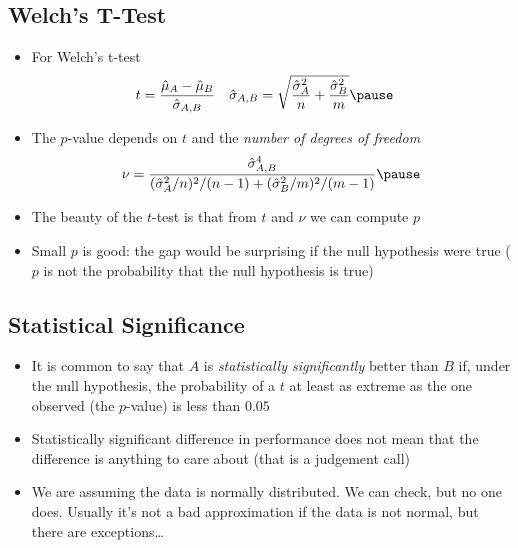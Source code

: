
\begin{slide}
\section{Welch's T-Test}

\begin{PauseHighLight}
  \begin{itemize}
  \item For Welch's t-test
    \begin{align*}
      t &= \frac{\hat{\mu}_A - \hat{\mu}_B}{\hat{\sigma}_{A,B}}
      &
      \hat{\sigma}_{A,B} &= \sqrt{\frac{\hat{\sigma}_A^2}{n} +
        \frac{\hat{\sigma}_B^2}{m} }\pause 
    \end{align*}
  \item The $p$-value depends on $t$ and the \textit{number of degrees of
      freedom}
    \begin{align*}
      \nu = \frac{ \hat{\sigma}_{A,B}^4}{(\hat{\sigma}_A^2/n)^2/(n-1)
        + (\hat{\sigma}_B^2/m)^2/(m-1)}\pause
    \end{align*}
  \item The beauty of the $t$-test is that from $t$ and $\nu$ we can
    compute $p$\pause
  \item Small $p$ is good: the gap would be surprising if the null
    hypothesis were true\pause{} {\small ($p$ is not the probability that
    the null hypothesis is true)}\pauseb
  \end{itemize}
\end{PauseHighLight}

\end{slide}


\begin{slide}
\section{Statistical Significance}

\begin{PauseHighLight}
  \begin{itemize}
  \item It is common to say that $A$ is \textit{statistically significantly}
    better than $B$ if, under the null hypothesis, the probability of a
    $t$ at least as extreme as the one observed (the $p$-value) is less
    than $0.05$\pause
  \item Statistically significant difference in performance does not
    mean that the difference is anything to care about\pause{} (that is
    a judgement call)\pauseb
  \item We are assuming the data is normally distributed\pause. We can
    check\pauseb, but no one does\pauseb. Usually it's not a bad approximation
    if the data is not normal\pauseb, but there are exceptions\ldots\pauseb
  \end{itemize}
\end{PauseHighLight}

\end{slide}


